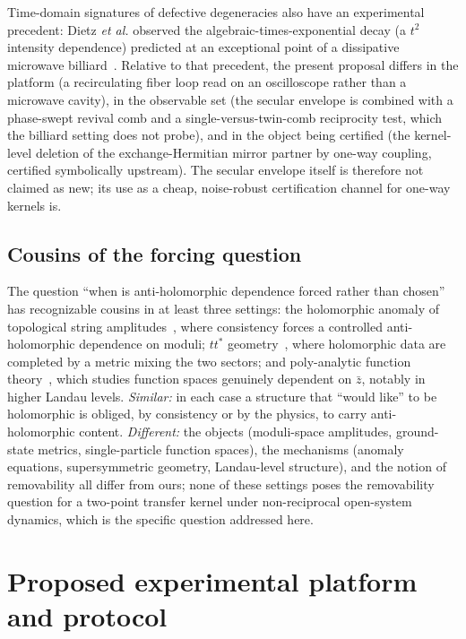 \documentclass[11pt,a4paper]{article}
\newcommand{\zb}{\bar{z}}
\begin{document}
Time-domain signatures of defective degeneracies also have an experimental
precedent: Dietz \emph{et al.} observed the algebraic-times-exponential decay
(a $t^{2}$ intensity dependence) predicted at an exceptional point of a
dissipative microwave billiard~\cite{Dietz2007}. Relative to that precedent,
the present proposal differs in the platform (a recirculating fiber loop read
on an oscilloscope rather than a microwave cavity), in the observable set (the
secular envelope is combined with a phase-swept revival comb and a
single-versus-twin-comb reciprocity test, which the billiard setting does not
probe), and in the object being certified (the kernel-level deletion of the
exchange-Hermitian mirror partner by one-way coupling, certified symbolically
upstream). The secular envelope itself is therefore not claimed as new; its
use as a cheap, noise-robust certification channel for one-way kernels is.

\subsection{Cousins of the forcing question}

The question ``when is anti-holomorphic dependence forced rather than chosen''
has recognizable cousins in at least three settings: the holomorphic anomaly of
topological string amplitudes~\cite{BCOV1994}, where consistency forces a
controlled anti-holomorphic dependence on moduli; $tt^*$
geometry~\cite{CecottiVafa1991}, where holomorphic data are completed by a
metric mixing the two sectors; and poly-analytic function
theory~\cite{Vasilevski2000,Abreu2010,AbreuFeichtinger2014}, which studies
function spaces genuinely dependent on $\zb$, notably in higher Landau levels.
\emph{Similar:} in each case a structure that ``would like'' to be holomorphic
is obliged, by consistency or by the physics, to carry anti-holomorphic
content. \emph{Different:} the objects (moduli-space amplitudes, ground-state
metrics, single-particle function spaces), the mechanisms (anomaly equations,
supersymmetric geometry, Landau-level structure), and the notion of
removability all differ from ours; none of these settings poses the
removability question for a two-point transfer kernel under non-reciprocal
open-system dynamics, which is the specific question addressed here.

\section{Proposed experimental platform and protocol}
\label{sec:platform}
\end{document}

